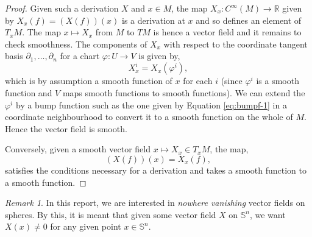 \documentclass[12pt,a4paper]{article}
\numberwithin{equation}{section}
\theoremstyle{definition}
\theoremstyle{remark}
\newtheorem{remark}{Remark}
\begin{document}
\begin{proof}
Given such a derivation $X$ and $x\in M$, the map $X_x:C^{\infty}(M)\to\mathbb{R}$ given by $X_x(f)=(X(f))(x)$ is a derivation at $x$ and so defines an element of $T_xM$. The map $x\mapsto X_x$ from $M$ to $TM$ is hence a vector field and it remains to check smoothness. The components of $X_x$ with respect to the coordinate tangent basis $\partial_1,\ldots,\partial_n$ for a chart $\varphi:U\to V$ is given by,
\[
X_x^i=X_x(\varphi^i),
\]
which is by assumption a smooth function of $x$ for each $i$ (since $\varphi^i$ is a smooth function and $V$ maps smooth functions to smooth functions). We can extend the $\varphi^i$ by a bump function such as the one given by Equation \eqref{eq:bumpf-1} in a coordinate neighbourhood to convert it to a smooth function on the whole of $M$. Hence the vector field is smooth.

Conversely, given a smooth vector field $x\mapsto X_x\in T_xM$, the map,
\[
(X(f))(x)=X_x(f),
\] 
satisfies the conditions necessary for a derivation and takes a smooth function to a smooth function.
%
\end{proof}
\begin{remark}
In this report, we are interested in \textit{nowhere vanishing} vector fields on spheres. By this, it is meant that given some vector field $X$ on $\mathbb{S}^n$, we want $X(x)\neq 0$ for any given point $x\in\mathbb{S}^n$.
\end{remark}
\end{document}
